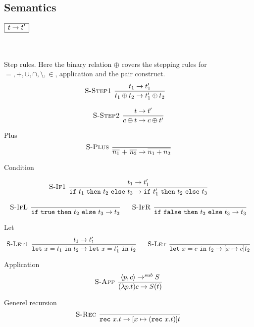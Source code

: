 \documentclass[a4paper]{article}
\newcommand{\s}[1]{\mathtt{#1}}
\newcommand{\sif}{\s{if\ }}
\newcommand{\sthen}{\s{\ then\ }}
\newcommand{\selse}{\s{\ else\ }}
\newcommand{\sifthenelse}[3]{\sif #1 \sthen #2 \selse #3}
\newcommand{\sletin}[2]{\s{let\ } #1 \s{\ in\ } #2}
\newcommand{\srec}{\s{rec\ }}
\newcommand{\strue}{\s{true}}
\newcommand{\sfalse}{\s{false}}
\newcommand{\step}{\to}
\newcommand{\stepsub}{\step^{sub}}
\newcommand{\angled}[1]{\langle #1\rangle}
\renewcommand{\rule}[3][]{\ \mbox{\textsc{#1 }}\dfrac{#2}{#3}\ }
\newcommand{\smbox}[1]{
  $\begin{array}{|c|}
    \hline
    #1 \\
    \hline
  \end{array}$
}
\begin{document}
\subsection{Semantics\label{sec:semantics}}

\smbox{t \step t'}
\\\\

Step rules. Here the binary relation $\oplus$ covers the stepping rules for $= ,+,\cup, \cap,\setminus,\in$, application and the pair construct.
\[\begin{array}{c}
\rule[S-Step1]{t_1 \step t_1'}{t_1 \oplus t_2 \step t_1' \oplus t_2}\quad\\\\
\rule[S-Step2]{t \step t'}{c \oplus t \step c \oplus t'}
\end{array}
\]


Plus
\[
\rule[S-Plus]{}{\overline{n_1} \s{\ +\ } \overline{n_2} \step \overline{n_1 + n_2}}
\]

Condition

\[\begin{array}{c}
\rule[S-If1]{t_1 \step t_1'}{\sifthenelse{t_1}{t_2}{t_3} \step \sifthenelse{t_1'}{t_2}{t_3}}\\\\
\rule[S-IfL]{}{\sifthenelse{\strue}{t_2}{t_3} \step t_2}\quad
\rule[S-IfR]{}{\sifthenelse{\sfalse}{t_2}{t_3} \step t_3}
\end{array}\]

Let
\[
\rule[S-Let1]{t_1 \step t_1'}
  {\sletin{x=t_1}{t_2} \step \sletin{x=t_1'}{t_2}}\quad
\rule[S-Let]{}{\sletin{x=c}{t_2} \step [x \mapsto c ] t_2}
\]


Application
\[
\rule[S-App]{\angled{p, c} \stepsub S}{(\lambda p.t) c \step S(t)}
\]

Generel recursion
\[
\rule[S-Rec]{}{\srec x.t \step [x \mapsto (\srec x.t)] t}
\]
\end{document}
